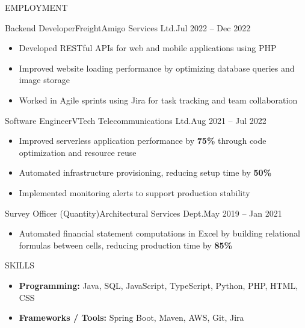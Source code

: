 \documentclass[]{resume}
\begin{document}
\begin{cvsection}{EMPLOYMENT}
		\begin{cvsubsection}{Backend Developer}{FreightAmigo Services Ltd.}{Jul 2022 -- Dec 2022}
			\begin{itemize}
                \item Developed RESTful APIs for web and mobile applications using PHP
                \item Improved website loading performance by optimizing database queries and image storage
                \item Worked in Agile sprints using Jira for task tracking and team collaboration
			\end{itemize}
		\end{cvsubsection}

		\begin{cvsubsection}{Software Engineer}{VTech Telecommunications Ltd.}{Aug 2021 -- Jul 2022}
			\begin{itemize}
                \item Improved serverless application performance by \textbf{75\%} through code optimization and resource reuse
                \item Automated infrastructure provisioning, reducing setup time by \textbf{50\%}
                \item Implemented monitoring alerts to support production stability
			\end{itemize}
		\end{cvsubsection}

		\begin{cvsubsection}{Survey Officer (Quantity)}{Architectural Services Dept.}{May 2019 -- Jan 2021}
			\begin{itemize}
                \item Automated financial statement computations in Excel by building relational formulas between cells, reducing production time by \textbf{85\%}
			\end{itemize}
		\end{cvsubsection}
	\end{cvsection}

	\begin{cvsection}{SKILLS}
		\begin{cvsubsection}{}{}{}
			\begin{itemize}
                \item \textbf{Programming:} Java, SQL, JavaScript, TypeScript, Python, PHP, HTML, CSS
                \item \textbf{Frameworks / Tools:} Spring Boot, Maven, AWS, Git, Jira
			\end{itemize}
		\end{cvsubsection}
	\end{cvsection}
\end{document}
